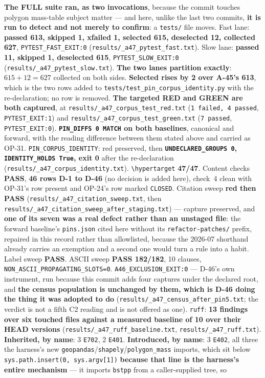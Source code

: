 \documentclass[
  10pt,
]{article}
\begin{document}
\textbf{The FULL suite ran, as two invocations}, because the commit touches polygon mass-table subject matter --- and here, unlike the last two commits, \textbf{it is run to detect and not merely to confirm}: a \texttt{tests/} file moves. Fast lane: \textbf{passed 613, skipped 1, xfailed 1, selected 615, deselected 12, collected 627}, \texttt{PYTEST\_FAST\_EXIT:0} (\texttt{results/\allowbreak{}\_a47\_pytest\_fast.txt}). Slow lane: \textbf{passed 11, skipped 1, deselected 615}, \texttt{PYTEST\_SLOW\_EXIT:0} (\texttt{results/\allowbreak{}\_a47\_pytest\_slow.txt}). \textbf{The two lanes partition exactly}: $615 + 12 = 627$ collected on both sides. \textbf{Selected rises by 2 over A-45's 613}, which is the two rows added to \texttt{tests/\allowbreak{}test\_pin\_corpus\_identity.py} with the re-declaration; no row is removed. \textbf{The targeted RED and GREEN are both captured}, at \texttt{results/\allowbreak{}\_a47\_corpus\_test\_red.txt} (\texttt{1 failed, 4 passed}, \texttt{PYTEST\_EXIT:1}) and \texttt{results/\allowbreak{}\_a47\_corpus\_test\_green.txt} (\texttt{7 passed}, \texttt{PYTEST\_EXIT:0}). \textbf{\texttt{PIN\_DIFFS 0 MATCH} on both baselines}, canonical and forward, with the reading difference between them stated above and carried as OP-31. \texttt{PIN\_CORPUS\_IDENTITY}: red preserved, then \textbf{\texttt{UNDECLARED\_GROUPS 0}, \texttt{IDENTITY\_HOLDS True}, exit 0} after the re-declaration (\texttt{results/\allowbreak{}\_a47\_corpus\_identity.txt}). \texttt{\textbackslash hypertarget} \textbf{47/47}. Content checks \textbf{PASS}, \textbf{46 rows D-1 to D-46} (no decision is added here), check~4 clean with OP-31's row present and OP-24's row marked \texttt{CLOSED}. Citation sweep \textbf{red then PASS} (\texttt{results/\allowbreak{}\_a47\_citation\_sweep.txt}, then \texttt{results/\allowbreak{}\_a47\_citation\_sweep\_after\_staging.txt}) --- capture preserved, and \textbf{one of its seven was a real defect rather than an unstaged file}: the forward baseline's \texttt{pins.json} cited here without its \texttt{refactor-patches/} prefix, repaired in this record rather than allowlisted, because the 2026-07 shorthand already carries an exemption and a second one would turn a rule into a habit. Label sweep \textbf{PASS}. ASCII sweep \textbf{PASS 182/182}, 10 clauses, \texttt{NON\_ASCII\_PROPAGATING\_SLOTS=0}. \texttt{A46\_EXCLUSION\_EXIT:0} --- D-46's own instrument, run because this commit adds four captures under the declared root, and \textbf{the census population is unchanged by them, which is D-46 doing the thing it was adopted to do} (\texttt{results/\allowbreak{}\_a47\_census\_after\_pin5.txt}; the verdict is not a fifth C2 reading and is not offered as one). \texttt{ruff}: \textbf{13 findings over six touched files against a measured baseline of 10 over their HEAD versions} (\texttt{results/\allowbreak{}\_a47\_ruff\_baseline.txt}, \texttt{results/\allowbreak{}\_a47\_ruff.txt}). \textbf{Inherited, by name}: 3 \texttt{E702}, 2 \texttt{E401}. \textbf{Introduced, by name}: 3 \texttt{E402}, all three the harness's new \texttt{geopandas}/\texttt{shapely}/\texttt{polygon\_mass} imports, which sit below \texttt{sys.path.insert(0, sys.argv[1])} \textbf{because that line is the harness's entire mechanism} --- it imports \texttt{bstpp} from a caller-supplied tree, so 
\end{document}
